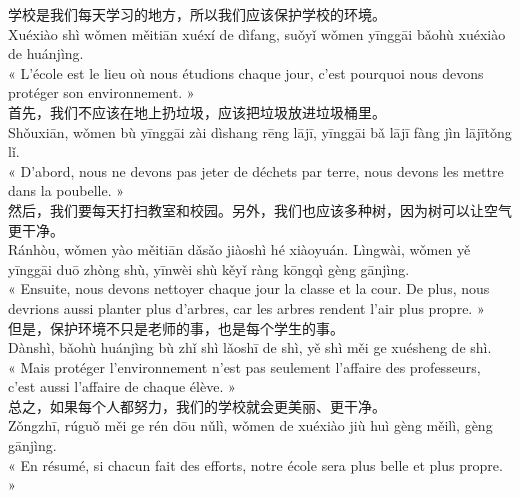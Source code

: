 \documentclass[11pt]{article}
\begin{document}
\begin{textebox}
学校是我们每天学习的地方，所以我们应该保护学校的环境。\\
Xuéxiào shì wǒmen měitiān xuéxí de dìfang, suǒyǐ wǒmen yīnggāi bǎohù xuéxiào de huánjìng.\\
« L'école est le lieu où nous étudions chaque jour, c'est pourquoi nous devons protéger son environnement. »\\[0.3em]
首先，我们不应该在地上扔垃圾，应该把垃圾放进垃圾桶里。\\
Shǒuxiān, wǒmen bù yīnggāi zài dìshang rēng lājī, yīnggāi bǎ lājī fàng jìn lājītǒng lǐ.\\
« D'abord, nous ne devons pas jeter de déchets par terre, nous devons les mettre dans la poubelle. »\\[0.3em]
然后，我们要每天打扫教室和校园。另外，我们也应该多种树，因为树可以让空气更干净。\\
Ránhòu, wǒmen yào měitiān dǎsǎo jiàoshì hé xiàoyuán. Lìngwài, wǒmen yě yīnggāi duō zhòng shù, yīnwèi shù kěyǐ ràng kōngqì gèng gānjìng.\\
« Ensuite, nous devons nettoyer chaque jour la classe et la cour. De plus, nous devrions aussi planter plus d'arbres, car les arbres rendent l'air plus propre. »\\[0.3em]
但是，保护环境不只是老师的事，也是每个学生的事。\\
Dànshì, bǎohù huánjìng bù zhǐ shì lǎoshī de shì, yě shì měi ge xuésheng de shì.\\
« Mais protéger l'environnement n'est pas seulement l'affaire des professeurs, c'est aussi l'affaire de chaque élève. »\\[0.3em]
总之，如果每个人都努力，我们的学校就会更美丽、更干净。\\
Zǒngzhī, rúguǒ měi ge rén dōu nǔlì, wǒmen de xuéxiào jiù huì gèng měilì, gèng gānjìng.\\
« En résumé, si chacun fait des efforts, notre école sera plus belle et plus propre. »
\end{textebox}
\end{document}
